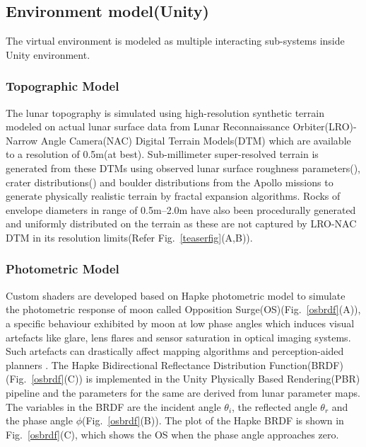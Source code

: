 \documentclass[a4paper, 10pt, conference]{ieeeconf}      %
\begin{document}
\subsection{Environment model(Unity)}
The virtual environment is modeled as multiple interacting sub-systems inside Unity environment.
\subsubsection{Topographic Model}
The lunar topography is simulated using high-resolution synthetic terrain modeled on actual lunar surface data from Lunar Reconnaissance Orbiter(LRO)-Narrow Angle Camera(NAC) Digital Terrain Models(DTM) which are available to a resolution of 0.5m(at best). Sub-millimeter super-resolved terrain is generated from these DTMs using observed lunar surface roughness parameters(\cite{manned1971analysis,rowan1971lunar}), crater distributions(\cite{neukum1975study,heiken1991lunar}) and boulder distributions \cite{watkins2018boulder} from the Apollo missions to generate physically realistic terrain by fractal expansion algorithms. Rocks of envelope diameters in range of 0.5m--2.0m have also been procedurally generated and uniformly distributed on the terrain as these are not captured by LRO-NAC DTM in its resolution limits(Refer Fig.~\ref{teaserfig}(A,B)).
\subsubsection{Photometric Model}
Custom shaders are developed based on Hapke photometric model\cite{hapke2012theory} to simulate the photometric response of moon called Opposition Surge(OS)\cite{gehrels1964wavelength}(Fig.~\ref{osbrdf}(A)), a specific behaviour exhibited by moon at low phase angles which induces visual artefacts like glare, lens flares and sensor saturation in optical imaging systems. Such artefacts can drastically affect mapping algorithms and perception-aided planners \cite{otsu2017look}. The Hapke Bidirectional Reflectance Distribution Function(BRDF)(Fig.~\ref{osbrdf}(C)) is implemented in the Unity Physically Based Rendering(PBR) pipeline\cite{pranckevivcius2014physically} and the parameters for the same are derived from lunar parameter maps\cite{sato2014resolved}. The variables in the BRDF are the incident angle $\theta_i$, the reflected angle $\theta_r$ and the phase angle $\phi$(Fig.~\ref{osbrdf}(B)). The plot of the Hapke BRDF is shown in Fig.~\ref{osbrdf}(C), which shows the OS when the phase angle approaches zero.
\end{document}
